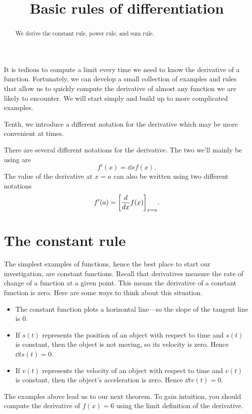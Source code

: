 \documentclass{ximera}
\title[Dig-In:]{Basic rules of differentiation}
\begin{document}
\begin{abstract}
  We derive the constant rule, power rule, and sum rule. 
\end{abstract}
\maketitle

It is tedious to compute a limit every time we need to know the
derivative of a function.  Fortunately, we can develop a small
collection of examples and rules that allow us to quickly compute the
derivative of almost any function we are likely to encounter.  We will
start simply and build up to more complicated examples.



Tenth, we introduce a different notation for the derivative which may be more convenient at times.


\begin{definition}
  There are several different notations for the derivative.  The two we'll mainly be using are
   \[
 f'(x)= \dd{x} f(x).
  \]
  The value of the derivative at $x=a$ can also be written using two different notations
  \[
 f'(a)= \bigg[ \frac{d}{\mathop{}\!d x} f(x) \bigg]_{x=a}. 
  \]
\end{definition}




\section{The constant rule}

The simplest examples of functions, hence the best place to start our
investigation, are constant functions.  Recall that derivatives
measure the rate of change of a function at a given point. This means the
derivative of a constant function is zero. Here are some ways to think about
this situation.
\begin{itemize}
\item The constant function plots a horizontal line---so the slope of
  the tangent line is $0$.
\item If $s(t)$ represents the position of an object with respect to
  time and $s(t)$ is constant, then the object is not moving, so its
  velocity is zero. Hence $\dd{t} s(t) = 0$.
\item If $v(t)$ represents the velocity of an object with respect to
  time and $v(t)$ is constant, then the object's acceleration is
  zero. Hence $\dd{t} v(t) = 0$.
\end{itemize}
The examples above lead us to our next theorem.
To gain intuition, you should compute the derivative of
  $f(x) = 6$ using the limit definition of the derivative.
\end{document}

